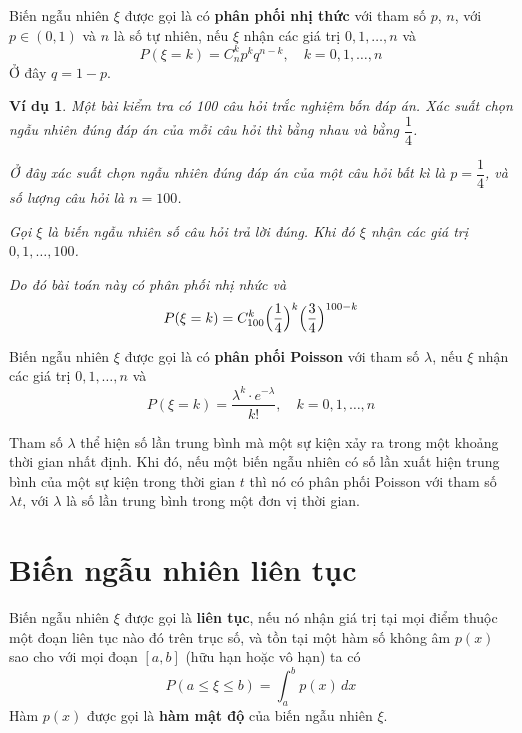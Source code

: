 \documentclass{mynotes}
\newtheorem{example}{Ví dụ}
\begin{document}
\begin{definition}
    Biến ngẫu nhiên $\xi$ được gọi là có \textbf{phân phối nhị thức} với tham số $p$, $n$, với $p \in (0, 1)$ và $n$ là số tự nhiên, nếu $\xi$ nhận các giá trị $0, 1, \ldots, n$ và 
    \begin{equation}
        P(\xi = k) = C^k_n p^k q^{n-k}, \quad k = 0, 1, \ldots, n
    \end{equation}
    Ở đây $q = 1 - p$.
\end{definition}

\begin{example}
    Một bài kiểm tra có 100 câu hỏi trắc nghiệm bốn đáp án. Xác suất chọn ngẫu nhiên đúng đáp án của mỗi câu hỏi thì bằng nhau và bằng $\dfrac{1}{4}$.

    Ở đây xác suất chọn ngẫu nhiên đúng đáp án của một câu hỏi bất kì là $p = \dfrac{1}{4}$, và số lượng câu hỏi là $n = 100$.

    Gọi $\xi$ là biến ngẫu nhiên số câu hỏi trả lời đúng. Khi đó $\xi$ nhận các giá trị $0, 1, \ldots, 100$.

    Do đó bài toán này có phân phối nhị nhức và \[ P(\xi = k) = C^k_{100} \Bigl(\dfrac{1}{4}\Bigr)^k \Bigl(\dfrac{3}{4}\Bigr)^{100-k}\]    
\end{example}

\begin{definition}
    Biến ngẫu nhiên $\xi$ được gọi là có \textbf{phân phối Poisson} với tham số $\lambda$, nếu $\xi$ nhận các giá trị $0, 1, \ldots, n$ và 
    \begin{equation}
        P(\xi = k) = \dfrac{\lambda^k \cdot e^{-\lambda}}{k!}, \quad k = 0, 1, \ldots, n
    \end{equation}
\end{definition}

Tham số $\lambda$ thể hiện số lần trung bình mà một sự kiện xảy ra trong một khoảng thời gian nhất định. Khi đó, nếu một biến ngẫu nhiên có số lần xuất hiện trung bình của một sự kiện trong thời gian $t$ thì nó có phân phối Poisson với tham số $\lambda t$, với $\lambda$ là số lần trung bình trong một đơn vị thời gian.

\section{Biến ngẫu nhiên liên tục}

\begin{definition}
    Biến ngẫu nhiên $\xi$ được gọi là \textbf{liên tục}, nếu nó nhận giá trị tại mọi điểm thuộc một đoạn liên tục nào đó trên trục số, và tồn tại một hàm số không âm $p(x)$ sao cho với mọi đoạn $[a ,b]$ (hữu hạn hoặc vô hạn) ta có
    \begin{equation}
        P(a \leq \xi \leq b) = \int_{a}^{b} p(x)\, dx
    \end{equation}
    Hàm $p(x)$ được gọi là \textbf{hàm mật độ} của biến ngẫu nhiên $\xi$.
\end{definition}
\end{document}
